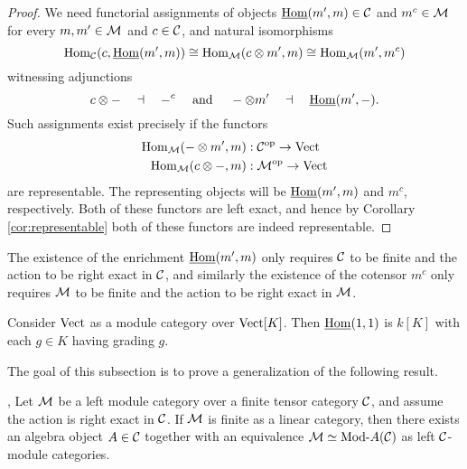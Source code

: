 \documentclass{amsart}
\begin{document}
\begin{proof}
	We need functorial assignments of objects $\operatorname{\underline{Hom}}(m', m) \in \mathcal C$ and $m^c \in \mathcal M$ for every $m,m' \in \mathcal M$ and $c \in \mathcal C$, and natural isomorphisms
	\begin{equation*}
		\operatorname{Hom}_\mathcal C(c, \operatorname{\underline{Hom}}(m', m)) \cong \operatorname{Hom}_\mathcal M(c \otimes m', m) \cong \operatorname{Hom}_\mathcal M( m', m^c)
	\end{equation*}
	witnessing adjunctions
	\begin{equation*}
			c \otimes - \quad \dashv\quad -^c \quad \textrm{ and } \quad - \otimes m' \quad \dashv \quad \operatorname{\underline{Hom}}(m', -).
	\end{equation*}
Such assignments exist precisely if the functors
\begin{align*}
	\operatorname{Hom}_\mathcal M(-\otimes m', m): \; & \mathcal C^{\mathrm{op}} \to \mathrm{Vect} \\
	\operatorname{Hom}_\mathcal M(c \otimes -, m): \; & \mathcal M^{\mathrm{op}} \to \mathrm{Vect}
\end{align*}
are representable. The representing objects will be $\operatorname{\underline{Hom}}(m', m)$ and $m^c$, respectively. Both of these functors are left exact, and hence by Corollary \ref{cor:representable} both of these functors are indeed representable.  %
\end{proof}

\begin{remark} \label{rem-enrich}
	The existence of the enrichment $\operatorname{\underline{Hom}}(m', m)$ only requires $\mathcal C$ to be finite and the action to be right exact in $\mathcal C$, and similarly the existence of the cotensor $m^c$ only requires $\mathcal M$ to be finite and the action to be right exact in $\mathcal M$.
\end{remark}

\begin{example}
Consider $\mathrm{Vect}$ as a module category over $\mathrm{Vect}[K]$.  Then $\operatorname{\underline{Hom}}(1,1)$ is $k[K]$ with each $g \in K$ having grading $g$.
\end{example}



The goal of this subsection is to prove a generalization of the following result.   

\begin{theorem}{\cite[Thm 2.11.6]{EGNO}, \cite[Thm 1]{MR1976459}} \label{thm:EGNO2.11.6}
	Let $\mathcal M$ be a left module category over a finite tensor category $\mathcal C$, and assume the action is right exact in $\mathcal C$. If $\mathcal M$ is finite as a linear category, then there exists an algebra object $A \in \mathcal C$ together with an equivalence $\cM \simeq \Mod{}{A} (\cC)$ as left $\mathcal C$-module categories. 
\end{theorem}
\end{document}
